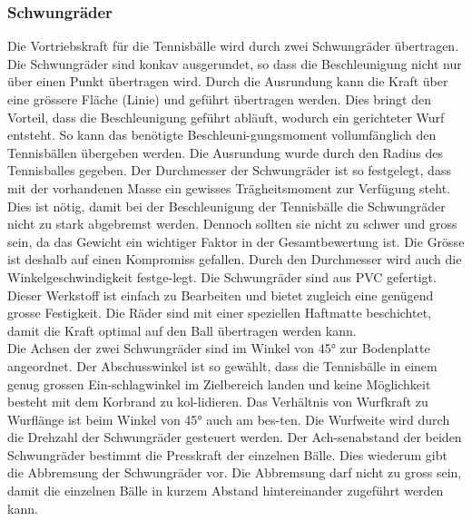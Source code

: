 \subsubsection{Schwungräder}
Die Vortriebskraft für die Tennisbälle wird durch zwei Schwungräder übertragen. Die Schwungräder sind konkav ausgerundet, so dass die Beschleunigung nicht nur über einen Punkt übertragen wird. Durch die Ausrundung kann die Kraft über eine grössere Fläche (Linie) und geführt übertragen werden. Dies bringt den Vorteil, dass die Beschleunigung geführt abläuft, wodurch ein gerichteter Wurf entsteht. So kann das benötigte Beschleuni-gungsmoment vollumfänglich den Tennisbällen übergeben werden. Die Ausrundung wurde durch den Radius des Tennisballes gegeben. Der Durchmesser der Schwungräder ist so festgelegt, dass mit der vorhandenen Masse ein gewisses Trägheitsmoment zur Verfügung steht. Dies ist nötig, damit bei der Beschleunigung der Tennisbälle die Schwungräder nicht zu stark abgebremst werden. Dennoch sollten sie nicht zu schwer und gross sein, da das Gewicht ein wichtiger Faktor in der Gesamtbewertung ist. Die Grösse ist deshalb auf einen Kompromiss gefallen. Durch den Durchmesser wird auch die Winkelgeschwindigkeit festge-legt. Die Schwungräder sind aus PVC gefertigt. Dieser Werkstoff ist einfach zu Bearbeiten und bietet zugleich eine genügend grosse Festigkeit. Die Räder sind mit einer speziellen Haftmatte beschichtet, damit die Kraft optimal auf den Ball übertragen werden kann. \\
Die Achsen der zwei Schwungräder sind im Winkel von 45° zur Bodenplatte angeordnet. Der Abschusswinkel ist so gewählt, dass die Tennisbälle in einem genug grossen Ein-schlagwinkel im Zielbereich landen und keine Möglichkeit besteht mit dem Korbrand zu kol-lidieren. Das Verhältnis von Wurfkraft zu Wurflänge ist beim Winkel von 45° auch am bes-ten. Die Wurfweite wird durch die Drehzahl der Schwungräder gesteuert werden. Der Ach-senabstand der beiden Schwungräder bestimmt die Presskraft der einzelnen Bälle. Dies wiederum gibt die Abbremsung der Schwungräder vor. Die Abbremsung darf nicht zu gross sein, damit die einzelnen Bälle in kurzem Abstand hintereinander zugeführt werden kann. 
